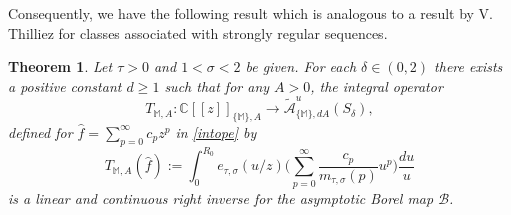 \documentclass[12pt,leqno]{amsart}
\def\C{\mathbb{C}}
\theoremstyle{plain}
\newtheorem{theo}{Theorem}[section]
\theoremstyle{definition}
\numberwithin{equation}{section}
\def\M{\mathbb{M}}
\begin{document}
Consequently, we have the following result which is analogous to a result by V. Thilliez \cite[Thm. 3.2.1]{Thilliez03} for classes associated with strongly regular sequences.

\begin{theo}\label{corolpral}
Let  $\tau>0$ and $1<\sigma<2$ be given. For each $\delta\in (0,2)$ there exists a positive constant $d\ge1$ such that for any $A>0$, the integral operator
$$ T_{\M,A}: \C[[z]]_{\{\M\},A} \longrightarrow \widetilde{\mathcal{A}}^u_{\{\M\},dA}(S_\delta),$$
defined for $\hat{f}= \sum_{p=0}^{\infty}c_p z^p $ in \eqref{intope} by
$$T_{\M,A}(\hat{f}):=\int_{0}^{R_0}e_{\tau,\sigma}(u/z) \Big(\sum_{p=0}^{\infty}\frac{c_{p}}{m_{\tau,\sigma}(p)} u^p\Big) \frac{du}{u}$$
is a linear and continuous right inverse for the asymptotic Borel map $\mathcal{B}$.
\end{theo}
\end{document}
